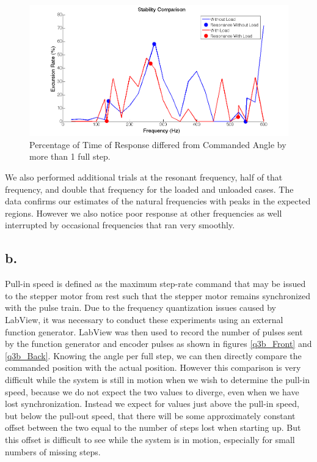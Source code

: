 \documentclass{article}
\theoremstyle{plain}
\theoremstyle{definition}
\theoremstyle{remark}
\begin{document}
\begin{figure}[hbt]
\begin{center}
\includegraphics[width = 15cm]{ResonanceData.png}
\caption{Percentage of Time of Response differed from Commanded Angle by more than 1 full step.}
\label{q3aii}
\end{center}
\end{figure}

We also performed additional trials at the resonant frequency, half of that frequency, and double that frequency for the loaded and unloaded cases.  The data confirms our estimates of the natural frequencies with peaks in the expected regions.  However we also notice poor response at other frequencies as well interrupted by occasional frequencies that ran very smoothly. 

\clearpage

\subsection*{b.}

Pull-in speed is defined as the maximum step-rate command that may be issued to the stepper motor from rest such that the stepper motor remains synchronized with the pulse train.  Due to the frequency quantization issues caused by LabView, it was necessary to conduct these experiments using an external function generator.  LabView was then used to record the number of pulses sent by the function generator and encoder pulses as shown in figures \ref{q3b_Front} and \ref{q3b_Back}.  Knowing the angle per full step, we can then directly compare the commanded position with the actual position.  However this comparison is very difficult while the system is still in motion when we wish to determine the pull-in speed, because we do not expect the two values to diverge, even when we have lost synchronization.  Instead we expect for values just above the pull-in speed, but below the pull-out speed, that there will be some approximately constant offset between the two equal to the number of steps lost when starting up.   But this offset is difficult to see while the system is in motion, especially for small numbers of missing steps.\\  
\end{document}
